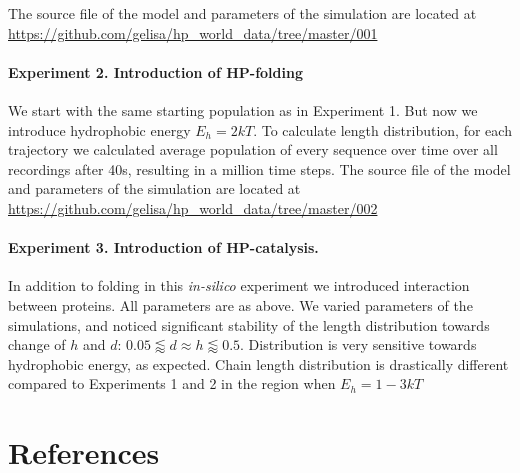 \documentclass[5p,times]{elsarticle}
\begin{document}
The source file of the model and parameters of the simulation are located at 
\url{https://github.com/gelisa/hp_world_data/tree/master/001}

\paragraph{Experiment 2. Introduction of HP-folding}
We start with the same starting population as in Experiment 1. But now we introduce hydrophobic 
energy $E_h= 2kT$. To calculate length distribution, 
for each trajectory we calculated average population of every sequence over time over all 
recordings 
after 40s, resulting in a million time steps. The source file of the model and parameters of the 
simulation are located at \url{https://github.com/gelisa/hp_world_data/tree/master/002}


\paragraph{Experiment 3. Introduction of HP-catalysis.}
In addition to folding in this \textit{in-silico} experiment we introduced interaction between 
proteins. All parameters are as above. We varied parameters of the simulations, and noticed 
significant stability of the length distribution towards change of $h$ and $d$: $0.05\lessapprox 
d\approx h \lessapprox 0.5$. Distribution is very sensitive towards hydrophobic energy, as 
expected. Chain length distribution is drastically different compared to Experiments 1 and 2 in 
the region when $E_h= 1-3 kT$
 
\section*{References}

\end{document}
